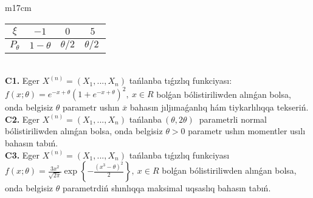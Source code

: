 \documentclass{article}
\begin{document}
\begin{tabular}{m{17cm}}
\begin{tabular}{|c|c|c|c|}
  \hline
$\xi$
&
$- 1$
&
$0$
&
$5$\\
\hline
\(P_{\theta}\) & \(1 - \theta\) & \(\theta/2\) & \(\theta/2\ \) \\
\hline
\end{tabular}
 \\
\textbf{C1.} 
Eger \(X^{(n)} = \left( X_{1},...,X_{n} \right)\) tańlanba tıǵızlıq funkciyası: \(f(x;\theta) = e^{- x + \theta}\left( 1 + e^{- x + \theta} \right)^{2},\ x \in R\)
bolǵan bólistiriliwden alınǵan bolsa, onda belgisiz \(\theta\) parametr ushın \(\overline{x}\) bahasın jıljımaǵanlıq hám tiykarlılıqqa tekseriń.
 \\
\textbf{C2.} 
Eger \(X^{(n)} = \left( X_{1},...,X_{n} \right)\) tańlanba\(\ (\theta,2\theta)\ \) parametrli normal bólistiriliwden alınǵan bolsa, onda belgisiz \(\theta > 0\) parametr ushın momentler usılı bahasın tabıń.
 \\
\textbf{C3.} 
Eger \(X^{(n)} = \left( X_{1},...,X_{n} \right)\) tańlanba tıǵızlıq funkciyası
$f(x;\theta) = \frac{3x^{2}}{\sqrt{2\pi}}\exp\left\{ - \frac{\left( x^{3} - \theta \right)^{2}}{2} \right\},\ x \in R$
bolǵan bólistiriliwden alınǵan bolsa, onda belgisiz \(\theta\) parametrdiń shınlıqqa maksimal uqsaslıq bahasın tabıń.
 \\

\end{tabular}
\vspace{1cm}
\end{document}
